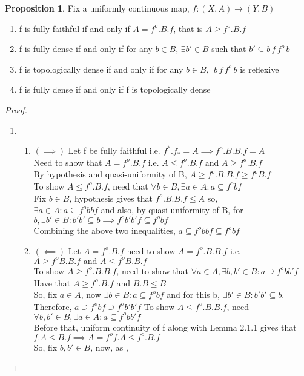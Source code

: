 \documentclass[18pt,a4paper]{article}
\theoremstyle{definition}
\newtheorem{proop}[theorem]{Proposition}
\begin{document}
\begin{proop}
	Fix a uniformly continuous map, $f:(X,A) \rightarrow (Y,B)$
	\begin{enumerate}[label=(\alph*)]
		\item f is fully faithful if and only if $A= f^o.B.f$, that is
			$A\geq f^o.B.f$
		\item f is fully dense if and only if for any $b\in B$, $\exists b' \in B$
			such that $b' \subseteq b\,f\,f^o \,b$
		\item f is topologically dense if and only if for any $b\in B$,
			$\; b \, f\, f^o\,b$ is reflexive
		\item f is fully dense if and only if f is topologically dense
	\end{enumerate}
\end{proop}
\begin{proof}\setcounter{equation}{0}

\item
	\begin{enumerate}[label=(\alph*)]
		\item \begin{enumerate}[label=(\roman*)]
			\item $ (\implies) $ Let f be fully faithful i.e. $f^*.f_*=A
				\implies f^o .B.B.f=A $\\
				Need to show that $A= f^o .B.f$ i.e.
				$A\leq f^o .B.f$ and  $A\geq f^o .B.f$\\
				By hypothesis and quasi-uniformity of B,
				$A\geq f^o .B.B.f \geq f^o B.f $\\
				To show $A \leq f^o .B.f$, need that $\forall b \in B, \exists a
				\in A : a \subseteq f^o bf$\\
				Fix $b\in B$, hypothesis gives that $f^o .B.B.f \leq A$ so, \\
				$\exists a \in A: a \subseteq f^o bbf$ and also, by
				quasi-uniformity of B, for $b, \exists b' \in B : b'b' \subseteq b
				\implies f^o b'b'f \subseteq f^o bf$\\
				Combining the above two inequalities,
				$a \subseteq f^o bbf \subseteq f^o bf$\\
			\item $(\impliedby)$ Let $A=f^o .B.f$ need to show $A=f^o.B.B.f$ i.e.
				$A\geq f^o B.B.f \text{ and } A\leq f^o B.B.f$\\
				To show $A\geq f^o .B.B.f$, need to show that $\forall a\in A,
				\exists b,b' \in B : a \supseteq f^o bb'f$\\
				Have that $A\geq f^o .B.f$ and $B.B \leq B$\\
				So, fix $a \in A$, now $\exists b\in B: a \subseteq f^o bf$
				and for this b, $\exists b'\in B: b'b' \subseteq b$.
				Therefore, $a \supseteq f^o bf \supseteq f^o b'b' f$
				To show $A\leq f^o .B.B.f$, need $\forall b,b'\in B, \exists
				a\in A : a \subseteq f^o bb'f$ \\
				Before that, uniform continuity
				of f along with Lemma 2.1.1 gives that \\$f.A\leq B.f
				\implies A=f^o f.A \leq f^o.B.f$ \\
				So, fix $b,b' \in B $, now, as ,


\end{enumerate}
\end{enumerate}
\end{proof}
\end{document}
